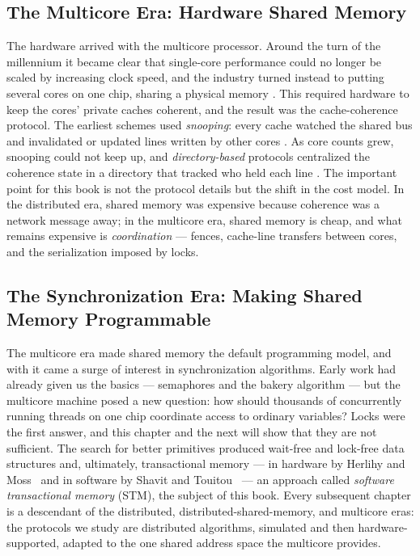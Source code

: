 \subsection{The Multicore Era: Hardware Shared Memory}

The hardware arrived with the multicore processor. Around the turn of the
millennium it became clear that single-core performance could no longer be
scaled by increasing clock speed, and the industry turned instead to putting
several cores on one chip, sharing a physical memory \cite{olukotun96case}.
This required hardware to keep the cores' private caches coherent, and the
result was the cache-coherence protocol. The earliest schemes used
\emph{snooping}: every cache watched the shared bus and invalidated or updated
lines written by other cores \cite{goodman83,papamarcos84}. As core counts
grew, snooping could not keep up, and \emph{directory-based} protocols
centralized the coherence state in a directory that tracked who held each line
\cite{archibald86}. The important point for this book is not the protocol
details but the shift in the cost model. In the distributed era, shared memory
was expensive because coherence was a network message away; in the multicore
era, shared memory is cheap, and what remains expensive is \emph{coordination}
--- fences, cache-line transfers between cores, and the serialization imposed
by locks.

\subsection{The Synchronization Era: Making Shared Memory Programmable}

The multicore era made shared memory the default programming model, and with
it came a surge of interest in synchronization algorithms. Early work had
already given us the basics --- semaphores \cite{dijkstra65} and the bakery
algorithm \cite{lamport74bakery} --- but the multicore machine posed a new
question: how should thousands of concurrently running threads on one chip
coordinate access to ordinary variables? Locks were the first answer, and this
chapter and the next will show that they are not sufficient. The search for
better primitives produced wait-free and lock-free data structures
\cite{herlihy91} and, ultimately, transactional memory --- in hardware by
Herlihy and Moss~\cite{herlihy93} and in software by Shavit and
Touitou~\cite{shavit95stm} --- an approach called \emph{software transactional
memory} (STM), the subject of this book. Every subsequent chapter is a descendant of the
distributed, distributed-shared-memory, and multicore eras: the protocols we
study are distributed algorithms, simulated and then hardware-supported,
adapted to the one shared address space the multicore provides.

